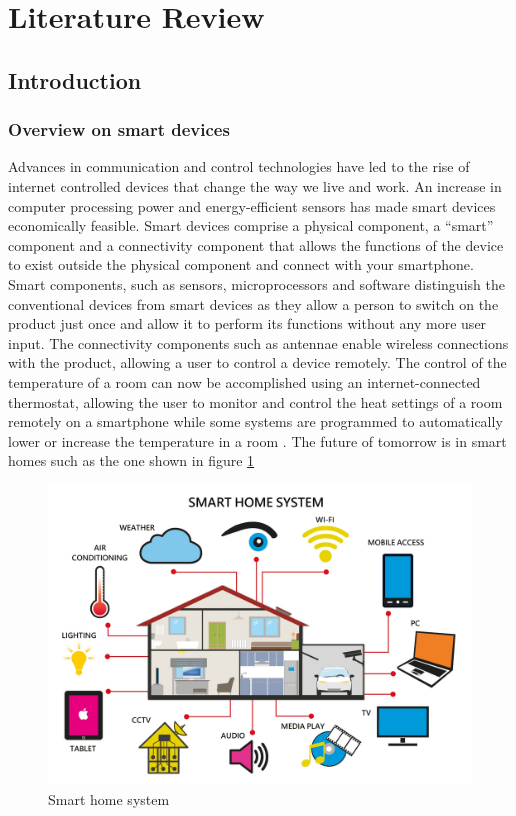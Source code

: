 \section{Literature Review}
\label{sec:review}
%

\subsection{Introduction}
\subsubsection{Overview on smart devices}

Advances in communication and control technologies have led to the rise of internet controlled devices that change the way we live and work. An increase in computer processing power and energy-efficient sensors has made smart devices economically feasible. Smart devices comprise a physical component, a “smart” component and a connectivity component that allows the functions of the device to exist outside the physical component and connect with your smartphone. Smart components, such as sensors, microprocessors and software distinguish the conventional devices from smart devices as they allow a person to switch on the product just once and allow it to perform its functions without any more user input. The connectivity components such as antennae enable wireless connections with the product, allowing a user to control a device remotely. The control of the temperature of a room can now be accomplished using an internet-connected thermostat, allowing the user to monitor and control the heat settings of a room remotely on a smartphone while some systems are programmed to automatically lower or increase the temperature in a room \cite{noauthor_3_nodate}. The future of tomorrow is in smart homes such as the one shown in figure \ref{fig:smarthome}

\begin{figure}[ht]
\includegraphics[width=0.9\linewidth]{Figures/Figure-01-smart-home.jpg}
\centering
\caption{Smart home system \cite{noauthor_visioforce_nodate}}
\label{fig:smarthome}
\end{figure}


